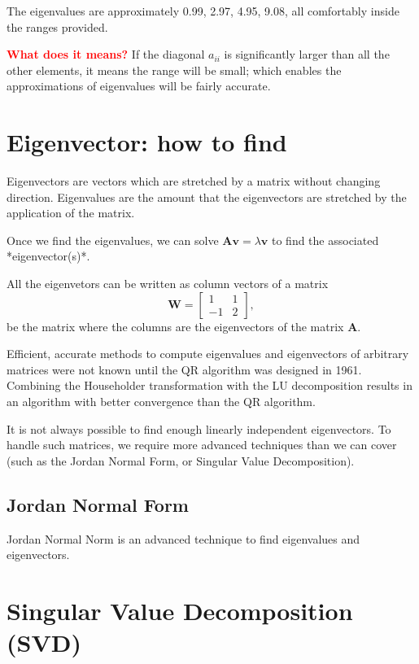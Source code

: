 The eigenvalues are approximately 0.99, 2.97, 4.95, 9.08, all comfortably inside
the ranges provided.


\textcolor{red}{\bf What does it means?} If the diagonal $a_{ii}$ is
significantly larger than all the other elements, it means the range will be
small; which enables the approximations of eigenvalues will be fairly accurate.





\section{Eigenvector: how to find}

Eigenvectors are vectors which are stretched by a matrix without changing
direction. Eigenvalues are the amount that the eigenvectors are stretched by the
application of the matrix. 

Once we find the eigenvalues, we can solve 
$\mathbf{A}\mathbf{v} = \lambda \mathbf{v}$ 
to find the associated *eigenvector(s)*.

All the eigenvetors can be written as column vectors of a matrix
\begin{equation}
\mathbf{W} = \begin{bmatrix}
1 & 1 \\
-1 & 2
\end{bmatrix},
\end{equation}
be the matrix where the columns are the eigenvectors of the matrix $\mathbf{A}$.

Efficient, accurate methods to compute eigenvalues and eigenvectors of arbitrary
matrices were not known until the QR algorithm was designed in 1961. Combining
the Householder transformation with the LU decomposition results in an algorithm
with better convergence than the QR algorithm.


It is not always possible to find enough linearly independent eigenvectors. To
handle such matrices, we require more advanced techniques than we can cover
(such as the Jordan Normal Form, or Singular Value Decomposition).

\subsection{Jordan Normal Form}

Jordan Normal Norm is an advanced technique to find eigenvalues and eigenvectors.


\section{Singular Value Decomposition (SVD)}
\label{sec:SVD}


